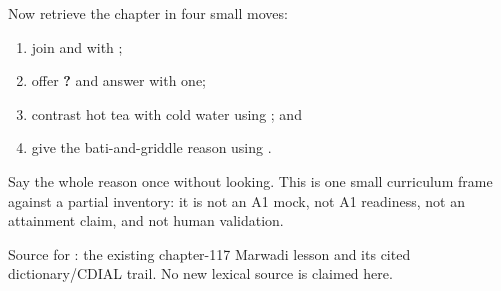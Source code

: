 Now retrieve the chapter in four small moves:

\begin{enumerate}
\raggedright
  \item join \textbf{} and \textbf{} with \textbf{};
  \item offer \textbf{  ?} and answer with one;
  \item contrast hot tea with cold water using \textbf{}; and
  \item give the bati-and-griddle reason using \textbf{}.
\end{enumerate}

\begin{tcolorbox}[breakable,colback=teal!4,colframe=teal!35!black,title={Before you move on}]
Say the whole reason once without looking. This is one small curriculum frame against a partial inventory: it is not an A1 mock, not A1 readiness, not an attainment claim, and not human validation.

Source for \textbf{}: the existing chapter-117 Marwadi lesson and its cited dictionary/CDIAL trail. No new lexical source is claimed here.
\end{tcolorbox}
